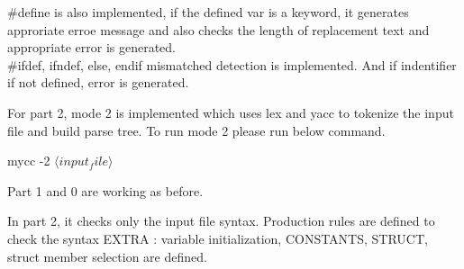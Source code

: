 \documentclass{article}
\begin{document}
$\#$define is also implemented, if the defined var is a keyword, it generates approriate erroe message and also checks the length of replacement text and appropriate error is generated. \\

$\#$ifdef, ifndef, else, endif mismatched detection is implemented.
And if indentifier if not defined,  error is generated.

For part 2,  mode 2 is implemented which uses lex and yacc to tokenize the input file and build parse tree. To run mode 2 please run below command.

mycc -2 $\langle input_file\rangle$

Part 1 and 0 are working as before.

In part 2, it checks only the input file syntax.
Production rules are defined to check the syntax
EXTRA : variable initialization, CONSTANTS, STRUCT, struct member selection are defined.
\end{document}
